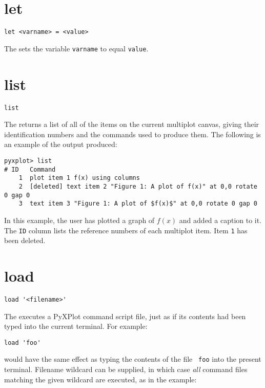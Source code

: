 \section{let}

\begin{verbatim}
let <varname> = <value>
\end{verbatim}

The  sets the variable {\tt varname} to equal {\tt value}.


\section{list}

\begin{verbatim}
list
\end{verbatim}

The  returns a list of all of the items on the current multiplot
canvas, giving their identification numbers and the commands used to produce
them.  The following is an example of the output produced:

{\footnotesize
\begin{verbatim}
pyxplot> list
# ID   Command
    1  plot item 1 f(x) using columns
    2  [deleted] text item 2 "Figure 1: A plot of f(x)" at 0,0 rotate 0 gap 0
    3  text item 3 "Figure 1: A plot of $f(x)$" at 0,0 rotate 0 gap 0
\end{verbatim}
}

In this example, the user has plotted a graph of $f(x)$ and added a caption to
it. The {\tt ID} column lists the reference numbers of each multiplot item.
Item {\tt 1} has been deleted.


\section{load}

\begin{verbatim}
load '<filename>'
\end{verbatim}

The  executes a PyXPlot command script file, just as if its
contents had been typed into the current terminal. For example:

\begin{verbatim}
load 'foo'
\end{verbatim}

\noindent would have the same effect as typing the contents of the file {\tt
foo} into the present terminal.  Filename wildcard can be supplied, in which
case {\it all} command files matching the given wildcard are executed, as in
the example:

